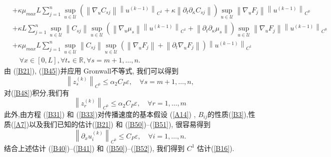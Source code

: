 \documentclass[notitlepage,cs4size,punct,oneside]{ctexrep}
\numberwithin{equation}{chapter}
\theoremstyle{mystyle}
\begin{document}
\begin{align}
     & +\kappa  \mu_{max} L \sum_{j=1}^{n} \sup _{u \in \mathcal{U}} \left( \left\|\nabla_{u} C_{s j} \right\| \left\|u^{(k-1)}\right\|_{C^{1}} +\kappa  \left\| \partial_{t} \partial_{\kappa } C_{s j} \right\|\right)  \sup _{u \in \mathcal{U}} \left\|\nabla_{u} F_{j}\right\| \left\| u^{(k-1)}\right\|_{C^{0}}\nonumber                                \\
     & +\kappa  L \sum_{j=1}^{n} \sup _{u \in \mathcal{U}}\left\| C_{s j}\right\| \sup _{u \in \mathcal{U}} \left( \left\|\nabla_{u} \mu_{s}\right\| \left\|u^{(k-1)}\right\|_{C^{1}} + \left\| \partial_{t} \partial_{\kappa } \mu_{s}\right\| \right)  \sup _{u \in \mathcal{U}} \left\|\nabla_{u} F_{j}\right\| \left\| u^{(k-1)}\right\|_{C^{0}}\nonumber \\
     & +\kappa \mu_{max} L \sum_{j=1}^{n} \sup _{u \in \mathcal{U}}\left\| C_{s j}\right\| \sup _{u \in \mathcal{U}} \left( \left\|\nabla_{u} F_{j}\right\| + \left\| \partial_{t} \nabla_{u} F_{j}\right\| \right)\left\|u^{(k-1)}\right\|_{C^{1}}\nonumber                                                                                                  \\
     & \quad \forall x \in[0, L], \forall t_{*} \in \mathbb{R}, \forall s=m+1, \ldots, n .\label{B49}
\end{align}
由 (\ref{B21}), (\ref{B45})并应用 Gronwall不等式, 我们可以得到
\begin{equation} \label{B50}
    \left\|z_{s}^{(k)}\right\|_{C^{0}} \leq \alpha_{2} C_{P} \varepsilon, \quad \forall s=m+1, \ldots, n,
\end{equation}
对(\ref{B48})积分,我们有
\begin{equation} \label{B51}
    \left\|z_{r}^{(k)}\right\|_{C^{0}} \leq \alpha_{2} C_{P} \varepsilon, \quad \forall r=1, \ldots, m
\end{equation}
此外,由方程 (\ref{B31}) 和 (\ref{B33})对传播速度的基本假设 (\ref{A14}) , $B_{i j}$的性质(\ref{B3}),性质(\ref{A7})以及我们已知的估计(\ref{B21}) 和 (\ref{B50})--(\ref{B51}), 很容易得到
\begin{equation} \label{B52}
    \left\|\partial_{x} u_{i}^{(k)}\right\|_{C^{0}} \leq C_{P} \varepsilon, \quad \forall i=1, \ldots, n.
\end{equation}
结合上述估计 (\ref{B40})--(\ref{B41}) 和 (\ref{B50})--(\ref{B52}), 我们得到 $C^{1}$ 估计(\ref{B16}).
\end{document}
